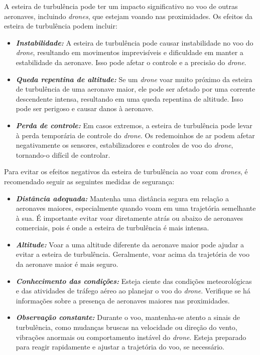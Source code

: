 \documentclass[a4paper, 12pt, onecolumn,singlespacing]{article}
\begin{document}
	A esteira de turbulência pode ter um impacto significativo no voo de outras aeronaves, incluindo \textit{drones}, que estejam voando nas proximidades. Os efeitos da esteira de turbulência podem incluir:
	\begin{itemize}
		\item \textbf{\textit{Instabilidade:}} A esteira de turbulência pode causar instabilidade no voo do \textit{drone}, resultando em movimentos imprevisíveis e dificuldade em manter a estabilidade da aeronave. Isso pode afetar o controle e a precisão do \textit{drone}.
		
		\item \textbf{\textit{Queda repentina de altitude:}} Se um \textit{drone} voar muito próximo da esteira de turbulência de uma aeronave maior, ele pode ser afetado por uma corrente descendente intensa, resultando em uma queda repentina de altitude. Isso pode ser perigoso e causar danos à aeronave.
		
		\item \textbf{\textit{Perda de controle:}} Em casos extremos, a esteira de turbulência pode levar à perda temporária de controle do \textit{drone}. Os redemoinhos de ar podem afetar negativamente os sensores, estabilizadores e controles de voo do \textit{drone}, tornando-o difícil de controlar.
		
	\end{itemize}	
	
	Para evitar os efeitos negativos da esteira de turbulência ao voar com \textit{drones}, é recomendado seguir as seguintes medidas de segurança:
	\begin{itemize}
		\item \textbf{\textit{Distância adequada:}} Mantenha uma distância segura em relação a aeronaves maiores, especialmente quando voam em uma trajetória semelhante à sua. É importante evitar voar diretamente atrás ou abaixo de aeronaves comerciais, pois é onde a esteira de turbulência é mais intensa.
		
		\item \textbf{\textit{Altitude:}} Voar a uma altitude diferente da aeronave maior pode ajudar a evitar a esteira de turbulência. Geralmente, voar acima da trajetória de voo da aeronave maior é mais seguro.
		
		\item \textbf{\textit{Conhecimento das condições:}} Esteja ciente das condições meteorológicas e das atividades de tráfego aéreo ao planejar o voo do \textit{drone}. Verifique se há informações sobre a presença de aeronaves maiores nas proximidades.
		
		\item \textbf{\textit{Observação constante:}} Durante o voo, mantenha-se atento a sinais de turbulência, como mudanças bruscas na velocidade ou direção do vento, vibrações anormais ou comportamento instável do \textit{drone}. Esteja preparado para reagir rapidamente e ajustar a trajetória do voo, se necessário.
		
	\end{itemize}
	
\end{document}
